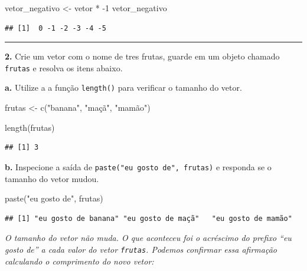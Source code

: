 \documentclass[
]{book}
\newenvironment{Shaded}{\begin{snugshade}}{\end{snugshade}}
\newcommand{\DecValTok}[1]{\textcolor[rgb]{0.00,0.00,0.81}{#1}}
\newcommand{\FunctionTok}[1]{\textcolor[rgb]{0.00,0.00,0.00}{#1}}
\newcommand{\NormalTok}[1]{#1}
\newcommand{\OtherTok}[1]{\textcolor[rgb]{0.56,0.35,0.01}{#1}}
\newcommand{\SpecialCharTok}[1]{\textcolor[rgb]{0.00,0.00,0.00}{#1}}
\newcommand{\StringTok}[1]{\textcolor[rgb]{0.31,0.60,0.02}{#1}}
\begin{document}
\begin{Shaded}
\begin{Highlighting}[]
\NormalTok{vetor\_negativo }\OtherTok{\textless{}{-}}\NormalTok{ vetor }\SpecialCharTok{*} \SpecialCharTok{{-}}\DecValTok{1}
\NormalTok{vetor\_negativo}
\end{Highlighting}
\end{Shaded}

\begin{verbatim}
## [1]  0 -1 -2 -3 -4 -5
\end{verbatim}

\begin{center}\rule{0.5\linewidth}{0.5pt}\end{center}

\textbf{2.} Crie um vetor com o nome de tres frutas, guarde em um objeto chamado \texttt{frutas} e resolva os itens abaixo.

\textbf{a.} Utilize a a função \texttt{length()} para verificar o tamanho do vetor.

\begin{Shaded}
\begin{Highlighting}[]
\NormalTok{frutas }\OtherTok{\textless{}{-}} \FunctionTok{c}\NormalTok{(}\StringTok{"banana"}\NormalTok{, }\StringTok{"maçã"}\NormalTok{, }\StringTok{"mamão"}\NormalTok{)}

\FunctionTok{length}\NormalTok{(frutas)}
\end{Highlighting}
\end{Shaded}

\begin{verbatim}
## [1] 3
\end{verbatim}

\textbf{b.} Inspecione a saída de \texttt{paste("eu\ gosto\ de",\ frutas)} e responda se o tamanho do vetor mudou.

\begin{Shaded}
\begin{Highlighting}[]
\FunctionTok{paste}\NormalTok{(}\StringTok{"eu gosto de"}\NormalTok{, frutas)}
\end{Highlighting}
\end{Shaded}

\begin{verbatim}
## [1] "eu gosto de banana" "eu gosto de maçã"   "eu gosto de mamão"
\end{verbatim}

\emph{O tamanho do vetor não muda. O que aconteceu foi o acréscimo do prefixo ``eu gosto de'' a cada valor do vetor \texttt{frutas}. Podemos confirmar essa afirmação calculando o comprimento do novo vetor:}
\end{document}
